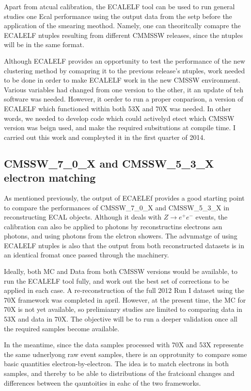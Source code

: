 \documentclass[10pt]{article}
\begin{document}
Apart from atcual calibration, the ECALELF tool can be used to run general studies one Ecal performance using the output data from the setp before the application of the smearing meothod. Namely, one can  theoritcally comapre the ECALELF ntuples resulting from different CMMSSW releases, since the ntuples will be in the same format.


Although ECALELF provides an opportunity to test the performance of the new clustering method by comapring it to the previous release's ntuples, work needed to be done in order to make ECALELF work in the new CMSSW environment. Various variables had changed from one version to the other, it an update of teh software was needed. However, it oerder to run a proper conparison, a version of ECALELF which functioned within both 53X and 70X was needed. In other words, we needed to develop code which could activelyd etect which CMSSW version was beign used, and make the required subsitutions at compile time. I carried out this work and compleyted it in the first quarter of 2014.

\subsection{CMSSW\_7\_0\_X and CMSSW\_5\_3\_X electron matching}

As mentioned previously, the output of ECAELEf provides a good starting point to compare the performances of CMSSW\_7\_0\_X and CMSSW\_5\_3\_X in reconstructing ECAL objects. Although it deals with $Z\rightarrow e^+ e^-$ events, the calibration can also be applied to photons by reconstructins electrons asn photons, and using photons from the elctron showers. The advnmatge of using ECALELF ntuples is also that the output from both reconstructed datasets is in an identical fromat once passed through the machinery.

Ideally, both MC and Data from both CMSSW versions would be available, to run the ECALELF tool fully, and work out the best set of corrections to be applied in each case. A re-reconstruction of the full 2012 Run I dataset using the 70X framework was completed in april. However, at the present time, the MC for 70X is not yet available, so prelimianry studies are limited to comparing data in 53X and data in 70X. The objective will be to run a deeper validation once all the required samples become available.

In the meantime, since the data samples processed with 70X and 53X represente the same udnerlyong raw event samples, there is an opprotunity to compare some basic quantities electron-by-electron. The idea is to match electrons in both samples, and thereby to be able to distributions of the fratcioanl changes and differences between the qauntoities in eahc of the two frameworks. 
\end{document}
